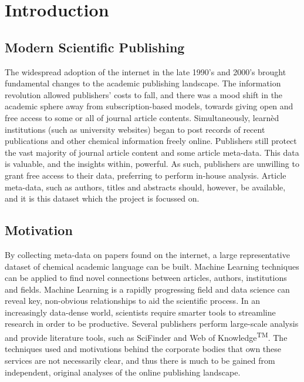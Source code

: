 \chapter{Introduction}
\section{Modern Scientific Publishing}
The widespread adoption of the internet in the late 1990’s and 2000’s brought  fundamental changes to the academic publishing landscape. The information revolution allowed publishers' costs to fall, and there was a mood shift in the academic sphere away from subscription-based models, towards giving open and free access to some or all of journal article contents.
Simultaneously, learn\`{e}d institutions (such as university websites) began to post records of recent publications and other chemical information freely online. 
Publishers still protect the vast majority of journal article content and some article meta-data. This data is valuable, and the insights within, powerful. As such, publishers are unwilling to grant free access to their data, preferring to perform in-house analysis. Article meta-data, such as authors, titles and abstracts should, however, be available, and it is this dataset which the project is focussed on. 
\section{Motivation}
By collecting meta-data on papers found on the internet, a large representative dataset of chemical academic  language can be built. Machine Learning techniques can be applied to find novel connections between articles, authors, institutions and fields. Machine Learning is a rapidly progressing field and data science can reveal key, non-obvious relationships to aid the scientific process. In an increasingly data-dense world, scientists require smarter tools to streamline research in order to be productive. Several publishers perform large-scale analysis and provide literature tools, such as SciFinder\textsuperscript{\textregistered} and Web of Knowledge\textsuperscript{TM}. The techniques used and motivations behind the corporate bodies that own these services are not necessarily clear, and thus there is much to be gained from independent, original analyses of the online publishing landscape. 
